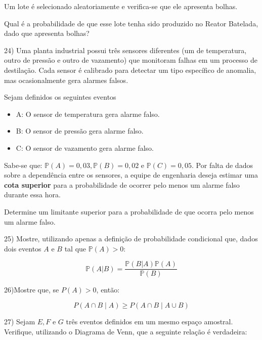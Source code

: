 \documentclass{article}
\begin{document}
Um lote é selecionado aleatoriamente e verifica-se que ele apresenta bolhas.


Qual é a probabilidade de que esse lote tenha sido produzido no Reator Batelada, dado que apresenta bolhas?

\vspace{5px}

24) Uma planta industrial possui três sensores diferentes (um de temperatura, outro de pressão e outro de vazamento) que monitoram falhas em um processo de destilação.
 Cada sensor é calibrado para detectar um tipo específico de anomalia, mas ocasionalmente gera alarmes falsos.

Sejam definidos os seguintes eventos

\begin{itemize}
    \item A: O sensor de temperatura gera alarme falso. 
    \item B: O sensor de pressão gera alarme falso.
    \item C: O sensor de vazamento gera alarme falso.
\end{itemize}

Sabe-se que: $\mathds{P}(A) = 0{,}03, \mathds{P}(B) = 0{,}02$ e $\mathds{P}(C) = 0{,}05$. Por falta de dados sobre a dependência entre os sensores, a equipe de engenharia deseja estimar uma \textbf{cota superior} para a probabilidade de ocorrer pelo menos um alarme falso durante essa hora.

Determine um limitante superior para a probabilidade de que ocorra pelo menos um alarme falso.

\vspace{5px}

25) Mostre, utilizando apenas a definição de probabilidade condicional que, dados dois eventos $A$ e $B$ tal que $\mathds{P}(A)>0$:

$$\mathds{P}(A|B) = \dfrac{\mathds{P}(B|A)\mathds{P}(A)}{\mathds{P}(B)}$$


\vspace{5px}

26)Mostre que, se \(P(A) > 0\), então:

\[
P(A \cap B \mid A) \geq P(A \cap B \mid A \cup B)
\]

\vspace{5px}

27) Sejam $E, F$ e $G$ três eventos definidos em um mesmo espaço amostral. Verifique, utilizando o Diagrama de Venn, que a seguinte relação é verdadeira:
\end{document}
